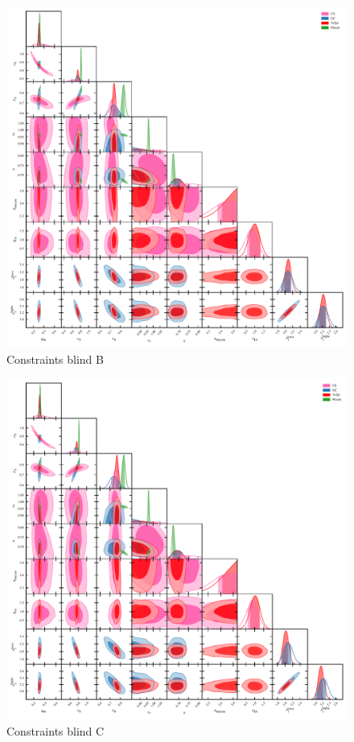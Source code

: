 \begin{figure}
	\begin{center}
		\includegraphics[width=\textwidth]{Parameter_Plots/cosmology/omegam_sigma8_s8_ns_h_a_baryon_a_ia_b1l_b1h_blind_B}
		\caption{Constraints blind B}
		\label{fig:cosmology-params-all}
	\end{center}
\end{figure}

\begin{figure}
	\begin{center}
		\includegraphics[width=\textwidth]{Parameter_Plots/cosmology/omegam_sigma8_s8_ns_h_a_baryon_a_ia_b1l_b1h_blind_C}
		\caption{Constraints blind C}
		\label{fig:cosmology-params-all}
	\end{center}
\end{figure}

